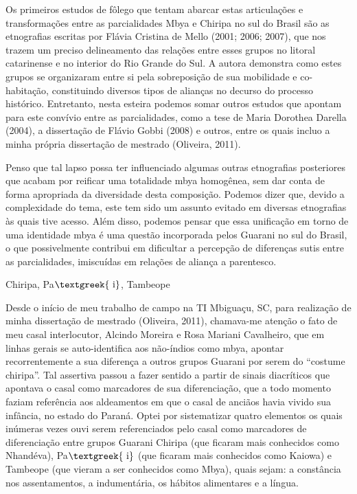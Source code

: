 \documentclass{article}
\begin{document}
Os primeiros estudos de f\^olego que tentam abarcar estas
articula\c{c}\~oes e transforma\c{c}\~oes entre as parcialidades Mbya e
Chiripa no sul do Brasil s\~ao as etnografias escritas por Fl\'avia
Cristina de Mello (2001; 2006; 2007), que nos trazem um preciso
delineamento das rela\c{c}\~oes entre esses grupos no litoral
catarinense e no interior do Rio Grande do Sul. A autora demonstra como
estes grupos se organizaram entre si pela sobreposi\c{c}\~ao de sua
mobilidade e co-habita\c{c}\~ao, constituindo diversos tipos de
alian\c{c}as no decurso do processo hist\'orico. Entretanto, nesta
esteira podemos somar outros estudos que apontam para este conv\'ivio
entre as parcialidades, como a tese de Maria Dorothea Darella (2004), a
disserta\c{c}\~ao de Fl\'avio Gobbi (2008) e outros, entre os quais
incluo a minha pr\'opria disserta\c{c}\~ao de mestrado (Oliveira,
2011). 

Penso que tal lapso possa ter influenciado algumas outras etnografias
posteriores que acabam por reificar uma totalidade mbya homog\^enea,
sem dar conta de forma apropriada da diversidade desta
composi\c{c}\~ao. Podemos dizer que, devido a complexidade do tema,
este tem sido um assunto evitado em diversas etnografias \`as quais
tive acesso. Al\'em disso, podemos pensar que essa unifica\c{c}\~ao em
torno de uma identidade mbya \'e uma quest\~ao incorporada pelos
Guarani no sul do Brasil, o que possivelmente contribui em dificultar a
percep\c{c}\~ao de diferen\c{c}as sutis entre as parcialidades,
imiscu\'idas em rela\c{c}\~oes de alian\c{c}a a parentesco.

Chiripa, Pa$\text{\textgreek{~i}}$, Tambeope

Desde o in\'icio de meu trabalho de campo na TI Mbigua\c{c}u, SC, para
realiza\c{c}\~ao de minha disserta\c{c}\~ao de mestrado (Oliveira,
2011), chamava-me aten\c{c}\~ao o fato de meu casal interlocutor,
Alcindo Moreira e Rosa Mariani Cavalheiro, que em linhas gerais se
auto-identifica aos n\~ao-\'indios como mbya, apontar recorrentemente a
sua diferen\c{c}a a outros grupos Guarani por serem do
{\textquotedblleft}costume chiripa{\textquotedblright}. Tal assertiva
passou a fazer sentido a partir de sinais diacr\'iticos que apontava o
casal como marcadores de sua diferencia\c{c}\~ao, que a todo momento
faziam refer\^encia aos aldeamentos em que o casal de anci\~aos havia
vivido sua inf\^ancia, no estado do Paran\'a. Optei por sistematizar
quatro elementos os quais in\'umeras vezes ouvi serem referenciados
pelo casal como marcadores de diferencia\c{c}\~ao entre grupos Guarani
Chiripa (que ficaram mais conhecidos como Nhand\'eva),
Pa$\text{\textgreek{~i}}$ (que ficaram mais conhecidos como Kaiowa) e
Tambeope (que vieram a ser conhecidos como Mbya), quais sejam: a
const\^ancia nos assentamentos, a indument\'aria, os h\'abitos
alimentares e a l\'ingua. 
\end{document}
